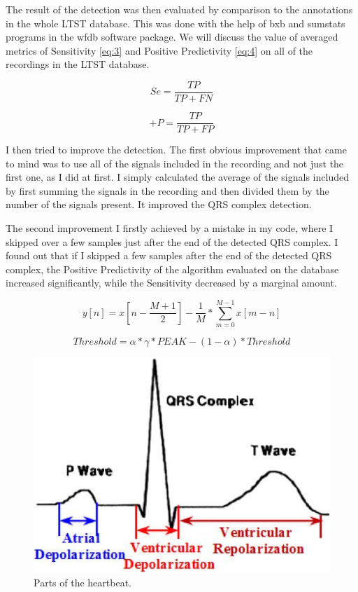 \documentclass[9pt]{IEEEtran}
\begin{document}
The result of the detection was then evaluated by comparison to the annotations in the whole LTST database. This was done with the help of bxb and sumstats programs in the wfdb software package. We will discuss the value of averaged metrics of Sensitivity \ref{eq:3} and Positive Predictivity  \ref{eq:4} on all of the recordings in the LTST database.

\begin{equation} \label{eq:3}
Se =  \dfrac{TP}{TP + FN} 
 \end{equation}

\begin{equation} \label{eq:4}
+P =  \dfrac{TP}{TP +FP} 
 \end{equation}

I then tried to improve the detection. The first obvious improvement that came to mind was to use all of the signals included in the recording and not just the first one, as I did at first. I simply calculated the average of the signals included by first summing the signals in the recording and then divided them by the number of the signals present. It improved the QRS complex detection.

The second improvement I firstly achieved by a mistake in my code, where I skipped over a few samples just after the end of the detected QRS complex. I found out that if I skipped a few samples after the end of the detected QRS complex, the Positive Predictivity of the algorithm evaluated on the database increased significantly, while the Sensitivity decreased by a marginal amount. 

\begin{equation} \label{eq:1}
 y[n] =  x[ n - \dfrac{M +1}{2}]  - \dfrac{1}{M}*\sum_{m=0}^{M-1}x[m-n] 
 \end{equation}

\begin{equation} \label{eq:2}
Threshold = \alpha*\gamma* PEAK - (1 - \alpha)*Threshold  
\end{equation}

\begin{figure}[!htb]
\centering
\includegraphics[width=1\columnwidth]{heartbeat.png}
\caption[c1]{ Parts of the heartbeat. }
\label{fig_sim1}
\end{figure}
\end{document}
